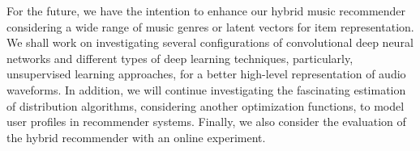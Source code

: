 \documentclass{article}
\begin{document}
For the future, we have the intention to enhance our hybrid music recommender considering a wide range of music genres or latent vectors for item representation. We shall work on investigating several configurations of convolutional deep neural networks and different types of deep learning techniques, particularly, unsupervised learning approaches, for a better high-level representation of audio waveforms. In addition, we will continue investigating the fascinating estimation of distribution algorithms, considering another optimization functions, to model user profiles in recommender systems. Finally, we also consider the evaluation of the hybrid recommender with an online experiment.




\end{document}
